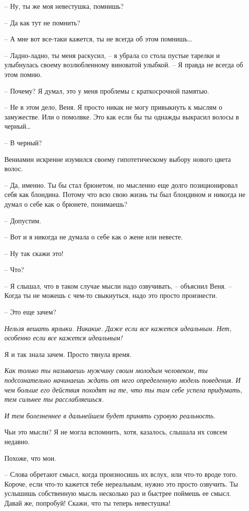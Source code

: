 \documentclass[
]{book}
\begin{document}
-- Ну, ты же моя невестушка, помнишь?

-- Да как тут не помнить?

-- А мне вот все-таки кажется, ты не всегда об этом помнишь\ldots{}

-- Ладно-ладно, ты меня раскусил, -- я убрала со стола пустые тарелки и улыбнулась своему возлюбленному виноватой улыбкой. -- Я правда не всегда об этом помню.

-- Почему? Я думал, это у меня проблемы с краткосрочной памятью.

-- Не в этом дело, Веня. Я просто никак не могу привыкнуть к мыслям о замужестве. Или о помолвке. Это как если бы ты однажды выкрасил волосы в черный\ldots{}

-- В черный?

Вениамин искренне изумился своему гипотетическому выбору нового цвета волос.

-- Да, именно. Ты бы стал брюнетом, но мысленно еще долго позиционировал себя как блондина. Потому что всю свою жизнь ты был блондином и никогда не думал о себе как о брюнете, понимаешь?

-- Допустим.

-- Вот и я никогда не думала о себе как о жене или невесте.

-- Ну так скажи это!

-- Что?

-- Я слышал, что в таком случае мысли надо озвучивать, -- объяснил Веня. -- Когда ты не можешь с чем-то свыкнуться, надо это просто произнести.

-- Это еще зачем?

\emph{Нельзя вешать ярлыки. Никакие. Даже если все кажется идеальным. Нет, особенно если все кажется идеальным!}

Я и так знала зачем. Просто тянула время.

\emph{Как только ты называешь мужчину своим молодым человеком, ты подсознательно начинаешь ждать от него определенную модель поведения. И чем больше его действия походят на те, что ты там себе успела придумать, тем сильнее ты расслабляешься.}

\emph{И тем болезненнее в дальнейшем будет принять суровую реальность.}

Чьи это мысли? Я не могла вспомнить, хотя, казалось, слышала их совсем недавно.

Похоже, что мои.

-- Слова обретают смысл, когда произносишь их вслух, или что-то вроде того. Короче, если что-то кажется тебе нереальным, нужно это просто озвучить. Ты услышишь собственную мысль несколько раз и быстрее поймешь ее смысл. Давай же, попробуй! Скажи, что ты теперь невестушка!
\end{document}
